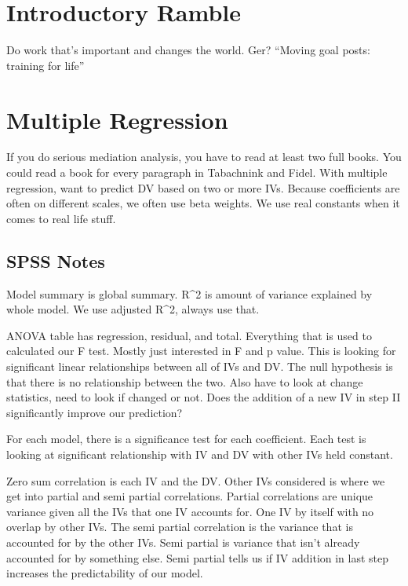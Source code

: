 \documentclass[]{book}
\theoremstyle{definition}
\theoremstyle{definition}
\theoremstyle{definition}
\theoremstyle{remark}
\begin{document}
\section{Introductory Ramble}\label{introductory-ramble}

Do work that's important and changes the world. Ger? ``Moving goal
posts: training for life''

\section{Multiple Regression}\label{multiple-regression-1}

If you do serious mediation analysis, you have to read at least two full
books. You could read a book for every paragraph in Tabachnink and
Fidel. With multiple regression, want to predict DV based on two or more
IVs. Because coefficients are often on different scales, we often use
beta weights. We use real constants when it comes to real life stuff.

\subsection{SPSS Notes}\label{spss-notes}

Model summary is global summary. R\^{}2 is amount of variance explained
by whole model. We use adjusted R\^{}2, always use that.

ANOVA table has regression, residual, and total. Everything that is used
to calculated our F test. Mostly just interested in F and p value. This
is looking for significant linear relationships between all of IVs and
DV. The null hypothesis is that there is no relationship between the
two. Also have to look at change statistics, need to look if changed or
not. Does the addition of a new IV in step II significantly improve our
prediction?

For each model, there is a significance test for each coefficient. Each
test is looking at significant relationship with IV and DV with other
IVs held constant.

Zero sum correlation is each IV and the DV. Other IVs considered is
where we get into partial and semi partial correlations. Partial
correlations are unique variance given all the IVs that one IV accounts
for. One IV by itself with no overlap by other IVs. The semi partial
correlation is the variance that is accounted for by the other IVs. Semi
partial is variance that isn't already accounted for by something else.
Semi partial tells us if IV addition in last step increases the
predictability of our model.
\end{document}
